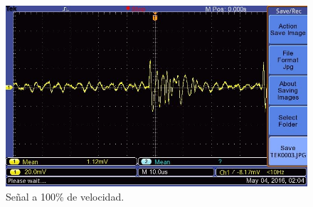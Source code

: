   \begin{figure}[!htbp]
 \centering
 \includegraphics [scale=0.25]
 {./img/tek0003.jpg}
  \caption{Se\~nal a 100\% de velocidad.}
 \end{figure}

